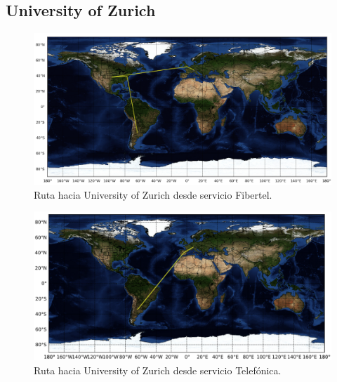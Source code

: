 \documentclass[10pt, a4paper]{article}
\begin{document}
\subsection{University of Zurich}
\begin{figure}[H] %
\begin{center}
\includegraphics[width=400pt]{../imgs/map-uzh.png}
\caption{Ruta hacia University of Zurich desde servicio Fibertel.}
\end{center}
\end{figure}

\begin{figure}[H] %
\begin{center}
\includegraphics[width=400pt]{../imgs/map-uzh(telef).png}
\caption{Ruta hacia University of Zurich desde servicio Telefónica.}
\end{center}
\end{figure}



\end{document}
